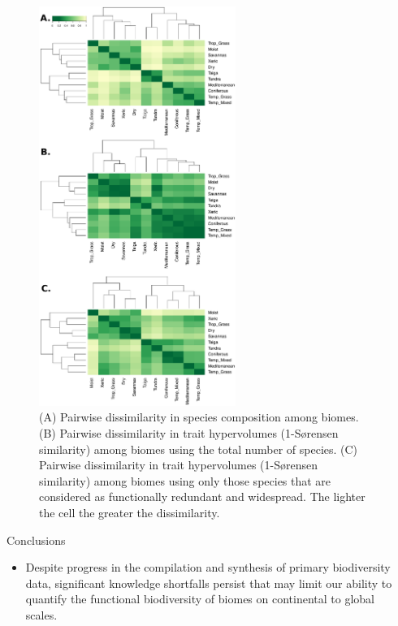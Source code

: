 \documentclass[final]{beamer}
\newlength{\sepwid}
\newlength{\onecolwid}
\begin{document}
\begin{frame}[t]
\begin{columns}[t]
  \begin{column}{\sepwid}\end{column}			%
  \begin{column}{\onecolwid}



	\begin{figure}[h]
		\centering
		\includegraphics[width=0.6\textwidth]{./figures/heatmaps.pdf}
		\caption{(A) Pairwise dissimilarity in species composition among biomes. (B) Pairwise dissimilarity in trait hypervolumes (1-S\o rensen similarity) among biomes using the total number of species. (C) Pairwise dissimilarity in trait hypervolumes (1-S\o rensen similarity) among biomes using only those species that are considered as functionally redundant and widespread. The lighter the cell the greater the dissimilarity.}
		\label{fig:heatmaps}
	\end{figure}


      		\begin{alertblock}{Conclusions}
      		\begin{itemize}
      		\item Despite progress in the compilation and synthesis of primary biodiversity data, significant knowledge shortfalls persist that may limit our ability to quantify the functional biodiversity of biomes on continental to global scales.
      		

\end{itemize}
\end{alertblock}
\end{column}
\end{columns}
\end{frame}
\end{document}
